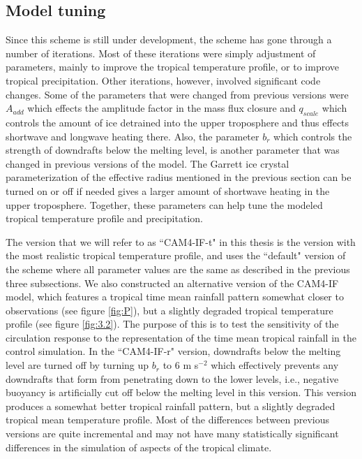 \documentclass[letterpaper,12pt,titlepage,oneside,final]{book}
\begin{document}
\subsection{Model tuning}\label{tune}

Since this scheme is still under development, the scheme has gone through a number of iterations. Most of these iterations were simply adjustment of parameters, mainly to improve the tropical temperature profile, or to improve tropical precipitation. Other iterations, however, involved significant code changes. Some of the parameters that were changed from previous versions were $A_{add}$ which effects the amplitude factor in the mass flux closure and $q_{scale}$ which controls the amount of ice detrained into the upper troposphere and thus effects shortwave and longwave heating there. Also, the parameter $b_{r}$ which controls the strength of downdrafts below the melting level, is another parameter that was changed in previous versions of the model. The Garrett ice crystal parameterization of the effective radius mentioned in the previous section can be turned on or off if needed gives a larger amount of shortwave heating in the upper troposphere. Together, these parameters can help tune the modeled tropical temperature profile and precipitation.

The version that we will refer to as ``CAM4-IF-t" in this thesis is the version with the most realistic tropical temperature profile, and uses the ``default" version of the scheme where all parameter values are the same as described in the previous three subsections. We also constructed an alternative version of the CAM4-IF model, which features a tropical time mean rainfall pattern somewhat closer to observations  (see figure \ref{fig:P}), but a slightly degraded tropical temperature profile (see figure \ref{fig:3.2}). The purpose of this is to test the sensitivity of the circulation response to the representation of the time mean tropical rainfall in the control simulation. In the ``CAM4-IF-r" version, downdrafts below the melting level are turned off by turning up $b_{r}$ to 6 m s$^{-2}$ which effectively prevents any downdrafts that form from penetrating down to the lower levels, i.e., negative buoyancy is artificially cut off below the melting level in this version. This version produces a somewhat better tropical rainfall pattern, but a slightly degraded tropical mean temperature profile. Most of the differences between previous versions are quite incremental and may not have many statistically significant differences in the simulation of aspects of the tropical climate.
\end{document}
